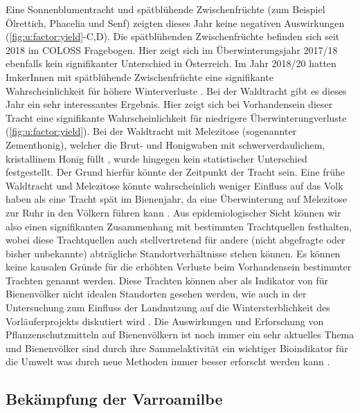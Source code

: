 \newline
Eine Sonnenblumentracht und spätblühende Zwischenfrüchte (zum Beispiel Ölrettich, Phacelia und Senf) zeigten dieses Jahr keine negativen Auswirkungen (\cref{fig:u:factor:yield}-C,D). Die spätblühenden Zwischenfrüchte befinden sich seit 2018 im COLOSS Fragebogen. Hier zeigt sich im Überwinterungsjahr 2017/18 \citep{gray2019} ebenfalls kein signifikanter Unterschied in Österreich. Im Jahr 2018/20  hatten ImkerInnen mit spätblühende Zwischenfrüchte eine signifikante Wahrscheinlichkeit für höhere Winterverluste \citep{oberreiter2020}. 
\newline
Bei der Waldtracht gibt es dieses Jahr ein sehr interessantes Ergebnis. Hier zeigt sich bei Vorhandensein dieser Tracht eine signifikante Wahrscheinlichkeit für niedrigere Überwinterungverluste (\cref{fig:u:factor:yield}). Bei der Waldtracht mit Melezitose (sogenannter Zementhonig), welcher die Brut- und Honigwaben mit schwerverdaulichem, kristallinem Honig füllt \citep{pechhacker1990}, wurde hingegen kein statistischer Unterschied festgestellt. Der Grund hierfür könnte der Zeitpunkt der Tracht sein. Eine frühe Waldtracht und Melezitose könnte wahrscheinlich weniger Einfluss auf das Volk haben als eine Tracht spät im Bienenjahr, da eine Überwinterung auf Melezitose zur Ruhr in den Völkern führen kann \citep{imdorf1985}. 
\newline
Aus epidemiologischer Sicht können wir also einen signifikanten Zusammenhang mit bestimmten Trachtquellen festhalten, wobei diese Trachtquellen auch stellvertretend für andere (nicht abgefragte oder bisher unbekannte) abträgliche Standortverhältnisse stehen können. Es können keine kausalen Gründe für die erhöhten Verluste beim Vorhandensein bestimmter Trachten genannt werden. Diese Trachten können aber als Indikator von für Bienenvölker nicht idealen Standorten gesehen werden, wie auch in der Untersuchung zum Einfluss der Landnutzung auf die Wintersterblichkeit des Vorläuferprojekts diskutiert wird \citep{kuchling2018}. Die Auswirkungen und Erforschung von Pflanzenschutzmitteln auf Bienenvölkern ist noch immer ein sehr aktuelles Thema und Bienenvölker sind durch ihre Sammelaktivität ein wichtiger Bioindikator für die Umwelt was durch neue Methoden immer besser erforscht werden kann \citep{murcia-morales2020}.

\subsection{Bekämpfung der Varroamilbe}

